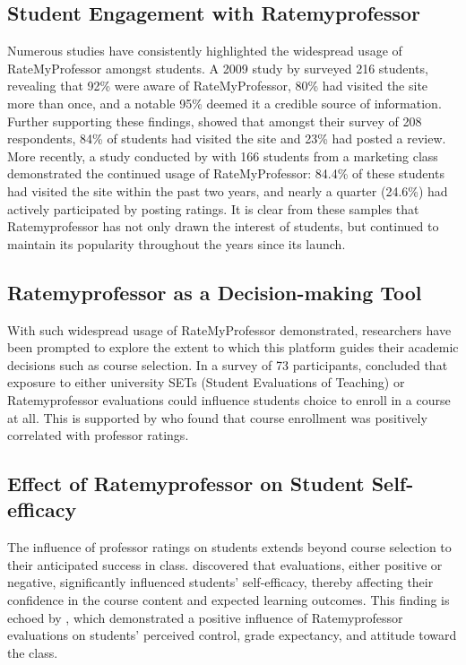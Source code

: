 \documentclass[doc, 12pt, twocolumn]{apa7}
\begin{document}
\subsection{Student Engagement with Ratemyprofessor}
Numerous studies have consistently highlighted the widespread usage of RateMyProfessor amongst students. A 2009 study by \textcite{davison_how_2009} surveyed 216 students, revealing that 92\% were aware of RateMyProfessor, 80\% had visited the site more than once, and a notable 95\% deemed it a credible source of information. Further supporting these findings, \textcite{bleske-rechek_ratemyprofessors_2010} showed that amongst their survey of 208 respondents, 84\% of students had visited the site and 23\% had posted a review. More recently, a study conducted by \textcite{chiang_students_2017} with 166 students from a marketing class demonstrated the continued usage of RateMyProfessor: 84.4\% of these students had visited the site within the past two years, and nearly a quarter (24.6\%) had actively participated by posting ratings. It is clear from these samples that Ratemyprofessor has not only drawn the interest of students, but continued to maintain its popularity throughout the years since its launch.

\subsection{Ratemyprofessor as a Decision-making Tool}
With such widespread usage of RateMyProfessor demonstrated, researchers have been prompted to explore the extent to which this platform guides their academic decisions such as course selection. In a survey of 73 participants, \textcite{boswell_effects_2020} concluded that exposure to either university SETs (Student Evaluations of Teaching) or Ratemyprofessor evaluations could influence students choice to enroll in a course at all. This is supported by \textcite{johnson_i_2014} who found that course enrollment was positively correlated with professor ratings.


\subsection{Effect of Ratemyprofessor on Student Self-efficacy}
The influence of professor ratings on students extends beyond course selection to their anticipated success in class. \textcite{boswell_effects_2020} discovered that evaluations, either positive or negative, significantly influenced students' self-efficacy, thereby affecting their confidence in the course content and expected learning outcomes. This finding is echoed by \textcite{kowai-bell_rate_2011}, which demonstrated a positive influence of Ratemyprofessor evaluations on students' perceived control, grade expectancy, and attitude toward the class.
\end{document}
